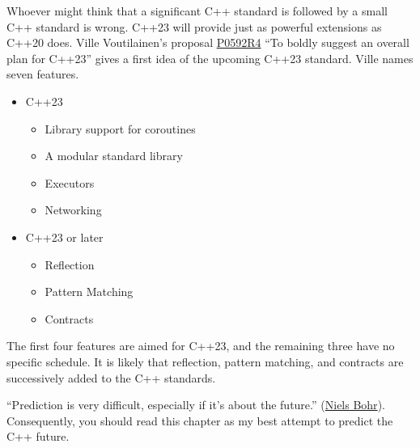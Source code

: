 Whoever might think that a significant C++ standard is followed by a small C++ standard is wrong. C++23 will provide just as powerful extensions as C++20 does. Ville Voutilainen’s proposal \href{http://www.open-std.org/jtc1/sc22/wg21/docs/papers/2019/p0592r4.html}{P0592R4} “To boldly suggest an overall plan for C++23” gives a first idea of the upcoming C++23 standard. Ville names seven features.

\begin{itemize}
\item 
C++23
\begin{itemize}
\item 
Library support for coroutines

\item 
A modular standard library

\item 
Executors

\item 
Networking
\end{itemize}

\item 
C++23 or later
\begin{itemize}
\item 
Reflection

\item 
Pattern Matching

\item 
 Contracts
\end{itemize}
\end{itemize}

The first four features are aimed for C++23, and the remaining three have no specific schedule. It is likely that reflection, pattern matching, and contracts are successively added to the C++ standards.

“Prediction is very difficult, especially if it’s about the future.” (\href{https://www.goodreads.com/quotes/23796-prediction-is-very-difficult-especially-about-the-future}{Niels Bohr}). Consequently, you should read this chapter as my best attempt to predict the C++ future.
















